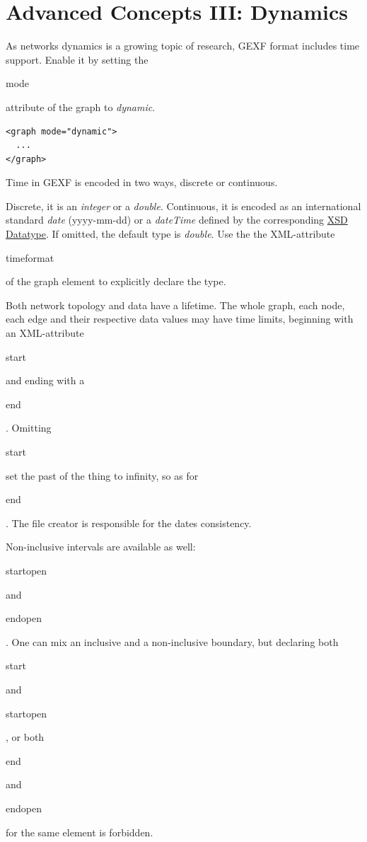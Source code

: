 \documentclass[a4paper,10pt]{article}
\begin{document}
\section{Advanced Concepts III: Dynamics} \label{dynamics}

As networks dynamics is a growing topic of research, GEXF format includes time support. Enable it by setting the \begin{footnotesize}mode\end{footnotesize} attribute of the graph to \textit{dynamic}.

\lstset{ style=gexf }
\begin{lstlisting}[caption={Dynamic Enabled!},label=dynamicEnabled]
<graph mode="dynamic">
  ...
</graph>
\end{lstlisting}

Time in GEXF is encoded in two ways, discrete or continuous.

Discrete, it is an \textit{integer} or a \textit{double}. Continuous, it is encoded as an international standard \textit{date} (yyyy-mm-dd) or a \textit{dateTime} defined by the corresponding \href{http://www.w3.org/TR/xmlschema-2/#dateTime}{XSD Datatype}. If omitted, the default type is \textit{double}. Use the the XML-attribute \begin{footnotesize}timeformat\end{footnotesize} of the graph element to explicitly declare the type.

Both network topology and data have a lifetime. The whole graph, each node, each edge and their respective data values may have time limits, beginning with an XML-attribute \begin{footnotesize}start\end{footnotesize} and ending with a \begin{footnotesize}end\end{footnotesize}. Omitting \begin{footnotesize}start\end{footnotesize} set the past of the thing to infinity, so as for \begin{footnotesize}end\end{footnotesize}. The file creator is responsible for the dates consistency.

Non-inclusive intervals are available as well: \begin{footnotesize}startopen\end{footnotesize} and \begin{footnotesize}endopen\end{footnotesize}. One can mix an inclusive and a non-inclusive boundary, but declaring both \begin{footnotesize}start\end{footnotesize} and \begin{footnotesize}startopen\end{footnotesize}, or both \begin{footnotesize}end\end{footnotesize} and \begin{footnotesize}endopen\end{footnotesize} for the same element is forbidden.
\end{document}
